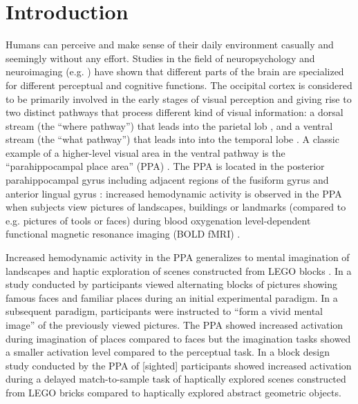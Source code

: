 \documentclass[english]{article}
\begin{document}
\pagebreak[4]


\section{Introduction}



Humans can perceive and make sense of their daily environment casually and
seemingly without any effort.
%
Studies in the field of neuropsychology and neuroimaging (e.g.
\citep{penfield1950cerebral, fox1984noninvasive}) have shown that different
parts of the brain are specialized for different perceptual and cognitive
functions.
The occipital cortex is considered to be primarily involved in the early stages
of visual perception and giving rise to two distinct pathways that process
different kind of visual information:
a dorsal stream (the ``where pathway'') that leads into the parietal lob , and a
ventral stream (the ``what pathway'') that leads into into the temporal lobe
\citep{goodale1992separate, mishkin1982contribution}.
A classic example of a higher-level visual area in the ventral pathway is the
``parahippocampal place area'' (PPA) \citep{epstein1998ppa,
epstein1999parahippocampal}.
The PPA is located in the posterior parahippocampal gyrus including adjacent
regions of the fusiform gyrus and anterior lingual gyrus
\citep{epstein2008parahippocampal}:
increased hemodynamic activity is observed in the PPA when subjects view
pictures of landscapes, buildings or landmarks (compared to e.g. pictures of
tools or faces) during blood oxygenation level-dependent functional magnetic
resonance imaging (BOLD fMRI) \citep{aguirre1998area, epstein2014neural,
epstein1998ppa, troiani2012object}.

Increased hemodynamic activity in the PPA generalizes to mental imagination of
landscapes \citep{ocraven2000mental} and haptic exploration of scenes
constructed from LEGO blocks \citep{wolbers2011modality}.
In a study conducted by \cite{ocraven2000mental} participants viewed alternating
blocks of pictures showing famous faces and familiar places during an initial
experimental paradigm.
In a subsequent paradigm, participants were instructed to ``form a vivid mental
image'' of the previously viewed pictures.
The PPA showed increased activation during imagination of places compared to
faces but the imagination tasks showed a smaller activation level compared to
the perceptual task.
In a block design study conducted by \cite{wolbers2011modality} the PPA of
[sighted] participants showed increased activation during a delayed
match-to-sample task of haptically explored scenes constructed from LEGO bricks
compared to haptically explored abstract geometric objects.
\end{document}
